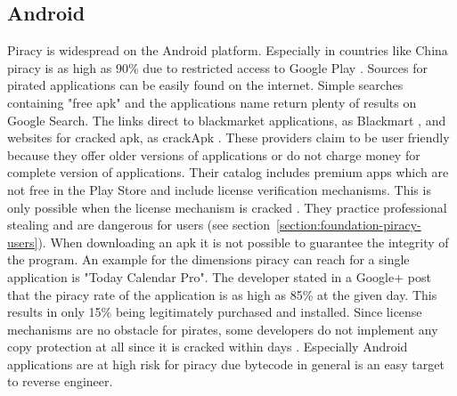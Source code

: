 \subsection{Android} \label{subsection:foundation-piracy-android}
Piracy is widespread on the Android platform. Especially in countries like China piracy is as high as 90\% due to restricted access to Google Play \cite{piracyRate}.
Sources for pirated applications can be easily found on the internet.
Simple searches containing "free apk" and the applications name return plenty of results on Google Search.
The links direct to blackmarket applications, as Blackmart \cite{blackmartStore}, and websites for cracked \gls{apk}, as crackApk \cite{crackApk}.
These providers claim to be user friendly because they offer older versions of applications or do not charge money for complete version of applications.
Their catalog includes premium apps which are not free in the Play Store and include license verification mechanisms.
This is only possible when the license mechanism is cracked \cite{apksfree}.
They practice professional stealing and are dangerous for users (see section~\ref{section:foundation-piracy-users}).
When downloading an \gls{apk} it is not possible to guarantee the integrity of the program.
\newline
An example for the dimensions piracy can reach for a single application is "Today Calendar Pro".
The developer stated in a Google+ post that the piracy rate of the application is as high as 85\% at the given day.
This results in only 15\% being legitimately purchased and installed. \cite{xdaPiracy}\cite{developersPiracy}
\newline
Since license mechanisms are no obstacle for pirates, some developers do not implement any copy protection at all since it is cracked within days \cite{recodeMonument}.
Especially Android applications are at high risk for piracy due bytecode in general is an easy target to reverse engineer.


%




%


